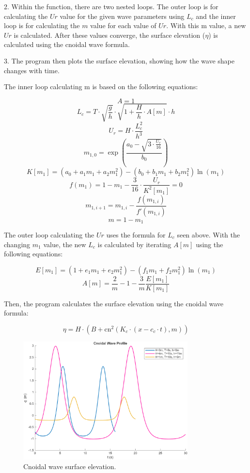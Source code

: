 \documentclass[a4paper]{article}
\begin{document}
2. Within the function, there are two nested loops. The outer loop is for calculating the \(Ur\) value for the given wave parameters using \(L_c\) and the inner loop is for calculating the \(m\) value for each value of \(Ur\). With this m value, a new \(Ur\) is calculated. After these values converge, the surface elevation ($\eta$) is calculated using the cnoidal wave formula.

3. The program then plots the surface elevation, showing how the wave shape changes with time.
\vspace{0.3cm}

The inner loop calculating m is based on the following equations:

\[A = 1 \]
\[ L_c = T \cdot \sqrt{\frac{g}{h}} \cdot \sqrt{1 + \frac{H}{h} \cdot A[m]} \cdot h \]
\[U_r = H \cdot \frac{L_c^2}{h^3} \]     
\[m_{1,0} = \exp\left(\frac{a_0 - \sqrt{3 \cdot \frac{U_r}{16}}}{b_0}\right)\]
\[K[m_1] = \left(a_0 + a_1 m_1 + a_2 m_1^2\right) - \left(b_0 + b_1 m_1 + b_2 m_1^2\right) \ln(m_1)\]
\[f(m_1) = 1 - m_1 - \frac{3}{16} \cdot \frac{U_r}{K^2[m_1]} = 0\]
\[m_{1,i+1} = m_{1,i} - \frac{f(m_{1,i})}{f'(m_{1,i})}\]
\[m = 1 - m_1\]
\vspace{0.3cm}

The outer loop calculating the \(Ur\) uses the formula for \(L_c\) seen above. With the changing \(m_1\) value, the new \(L_c\) is calculated by iterating \(A[m]\) using the following equations:

\[E[m_1] = \left(1 + e_1 m_1 + e_2 m_1^2\right) - \left(f_1 m_1 + f_2 m_1^2\right) \ln(m_1)\]
\[A[m] = \frac{2}{m} - 1 - \frac{3}{m} \frac{E[m_1]}{K[m_1]}\]
\vspace{0.3cm}

Then, the program calculates the surface elevation using the cnoidal wave formula:

\[\eta = H \cdot \left(B + \text{cn}^2\left(K_c \cdot (x - c_c \cdot t), m\right)\right)\]

\begin{figure}[H]
    \centering
    \includegraphics[width=0.8\textwidth]{CE591HW1-Q4.png}
    \caption{\small Cnoidal wave surface elevation.}
    \label{fig:plot4}
\end{figure} 
\vspace{0.3cm}
\end{document}
